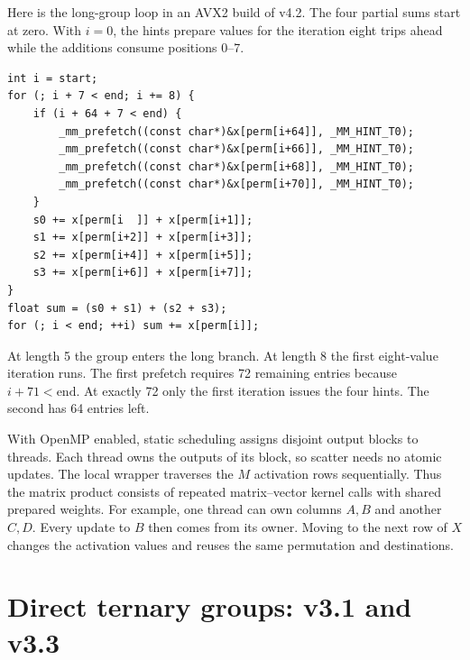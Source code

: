 \documentclass[11pt,a4paper]{article}
\begin{document}
Here is the long-group loop in an AVX2 build of v4.2. The four partial
sums start at zero. With \(i=0\), the hints prepare values for the
iteration eight trips ahead while the additions consume positions 0--7.
\begin{lstlisting}
int i = start;
for (; i + 7 < end; i += 8) {
    if (i + 64 + 7 < end) {
        _mm_prefetch((const char*)&x[perm[i+64]], _MM_HINT_T0);
        _mm_prefetch((const char*)&x[perm[i+66]], _MM_HINT_T0);
        _mm_prefetch((const char*)&x[perm[i+68]], _MM_HINT_T0);
        _mm_prefetch((const char*)&x[perm[i+70]], _MM_HINT_T0);
    }
    s0 += x[perm[i  ]] + x[perm[i+1]];
    s1 += x[perm[i+2]] + x[perm[i+3]];
    s2 += x[perm[i+4]] + x[perm[i+5]];
    s3 += x[perm[i+6]] + x[perm[i+7]];
}
float sum = (s0 + s1) + (s2 + s3);
for (; i < end; ++i) sum += x[perm[i]];
\end{lstlisting}
At length 5 the group enters the long branch. At length 8 the first
eight-value iteration runs. The first prefetch requires 72 remaining
entries because \(i+71<\mathrm{end}\). At exactly 72 only the first
iteration issues the four hints. The second has 64 entries left.

With OpenMP enabled, static scheduling assigns disjoint output blocks to
threads. Each thread owns the outputs of its block, so scatter needs no
atomic updates. The local wrapper traverses the \(M\) activation rows
sequentially. Thus the matrix product consists of repeated matrix--vector
kernel calls with shared prepared weights. For example, one thread can own
columns \(A,B\) and another \(C,D\). Every update to \(B\) then comes
from its owner. Moving to the next row of \(X\) changes the activation
values and reuses the same permutation and destinations.

\section{Direct ternary groups: v3.1 and v3.3}\label{sec:ternary}
\end{document}
